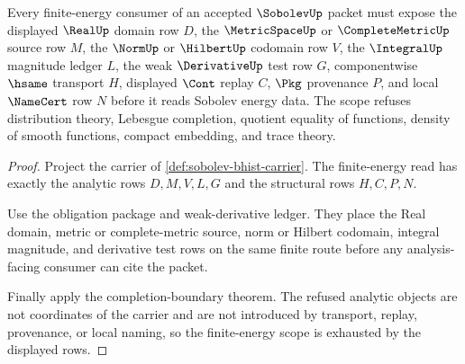 \begin{theorem}
\label{thm:sobolev-finite-energy-obligation-scope}
Every finite-energy consumer of an accepted $\SobolevUp$ packet must expose the displayed $\RealUp$ domain row $D$, the $\MetricSpaceUp$ or $\CompleteMetricUp$ source row $M$, the $\NormUp$ or $\HilbertUp$ codomain row $V$, the $\IntegralUp$ magnitude ledger $L$, the weak $\DerivativeUp$ test row $G$, componentwise $\hsame$ transport $H$, displayed $\Cont$ replay $C$, $\Pkg$ provenance $P$, and local $\NameCert$ row $N$ before it reads Sobolev energy data. The scope refuses distribution theory, Lebesgue completion, quotient equality of functions, density of smooth functions, compact embedding, and trace theory.
\end{theorem}
\begin{proof}
Project the carrier of \autoref{def:sobolev-bhist-carrier}. The finite-energy read has exactly the analytic rows $D,M,V,L,G$ and the structural rows $H,C,P,N$.

Use the obligation package and weak-derivative ledger. They place the Real domain, metric or complete-metric source, norm or Hilbert codomain, integral magnitude, and derivative test rows on the same finite route before any analysis-facing consumer can cite the packet.

Finally apply the completion-boundary theorem. The refused analytic objects are not coordinates of the carrier and are not introduced by transport, replay, provenance, or local naming, so the finite-energy scope is exhausted by the displayed rows.
\end{proof}

